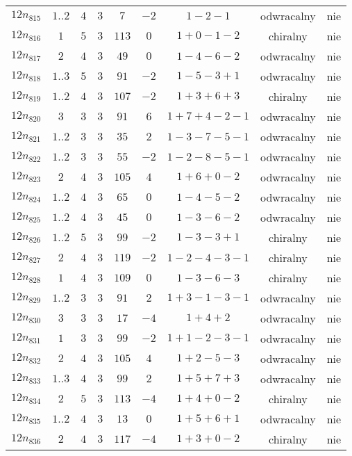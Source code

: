 \begin{longtable}{ccccccccc}
$12n_{815}$ & $1..2$ & $4$ & $3$ & $7$ & $-2$ & $1-2-1$ & odwracalny & nie \\
$12n_{816}$ & $1$ & $5$ & $3$ & $113$ & $0$ & $1+0-1-2$ & chiralny & nie \\
$12n_{817}$ & $2$ & $4$ & $3$ & $49$ & $0$ & $1-4-6-2$ & odwracalny & nie \\
$12n_{818}$ & $1..3$ & $5$ & $3$ & $91$ & $-2$ & $1-5-3+1$ & odwracalny & nie \\
$12n_{819}$ & $1..2$ & $4$ & $3$ & $107$ & $-2$ & $1+3+6+3$ & chiralny & nie \\
$12n_{820}$ & $3$ & $3$ & $3$ & $91$ & $6$ & $1+7+4-2-1$ & odwracalny & nie \\
$12n_{821}$ & $1..2$ & $3$ & $3$ & $35$ & $2$ & $1-3-7-5-1$ & odwracalny & nie \\
$12n_{822}$ & $1..2$ & $3$ & $3$ & $55$ & $-2$ & $1-2-8-5-1$ & odwracalny & nie \\
$12n_{823}$ & $2$ & $4$ & $3$ & $105$ & $4$ & $1+6+0-2$ & odwracalny & nie \\
$12n_{824}$ & $1..2$ & $4$ & $3$ & $65$ & $0$ & $1-4-5-2$ & odwracalny & nie \\
$12n_{825}$ & $1..2$ & $4$ & $3$ & $45$ & $0$ & $1-3-6-2$ & odwracalny & nie \\
$12n_{826}$ & $1..2$ & $5$ & $3$ & $99$ & $-2$ & $1-3-3+1$ & chiralny & nie \\
$12n_{827}$ & $2$ & $4$ & $3$ & $119$ & $-2$ & $1-2-4-3-1$ & chiralny & nie \\
$12n_{828}$ & $1$ & $4$ & $3$ & $109$ & $0$ & $1-3-6-3$ & chiralny & nie \\
$12n_{829}$ & $1..2$ & $3$ & $3$ & $91$ & $2$ & $1+3-1-3-1$ & odwracalny & nie \\
$12n_{830}$ & $3$ & $3$ & $3$ & $17$ & $-4$ & $1+4+2$ & odwracalny & nie \\
$12n_{831}$ & $1$ & $3$ & $3$ & $99$ & $-2$ & $1+1-2-3-1$ & odwracalny & nie \\
$12n_{832}$ & $2$ & $4$ & $3$ & $105$ & $4$ & $1+2-5-3$ & odwracalny & nie \\
$12n_{833}$ & $1..3$ & $4$ & $3$ & $99$ & $2$ & $1+5+7+3$ & odwracalny & nie \\
$12n_{834}$ & $2$ & $5$ & $3$ & $113$ & $-4$ & $1+4+0-2$ & chiralny & nie \\
$12n_{835}$ & $1..2$ & $4$ & $3$ & $13$ & $0$ & $1+5+6+1$ & odwracalny & nie \\
$12n_{836}$ & $2$ & $4$ & $3$ & $117$ & $-4$ & $1+3+0-2$ & chiralny & nie \\

\end{longtable}
